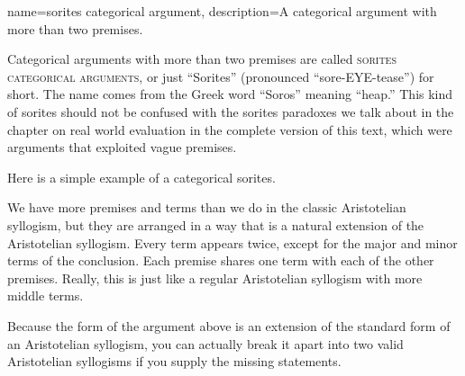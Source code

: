 {
name=sorites categorical argument,
description={A categorical argument with more than two premises.}
}

Categorical arguments with more than two premises are called \textsc{\glspl{sorites categorical argument}}, \label{def:sorites_categorical_arguments} or just ``Sorites'' (pronounced ``sore-EYE-tease'') for short. The name comes from the Greek word ``Soros'' meaning ``heap.'' This kind of sorites should not be confused with the sorites paradoxes we talk about in the chapter on real world evaluation in the complete version of this text, \label{ver_var}  which were arguments that exploited vague premises.

Here is a simple example of a categorical sorites.

\begin{kormanize}
\end{kormanize}

We have more premises and terms than we do in the classic Aristotelian syllogism, but they are arranged in a way that is a natural extension of the Aristotelian syllogism. Every term appears twice, except for the major and minor terms of the conclusion. Each premise shares one term with each of the other premises. Really, this is just like a regular Aristotelian syllogism with more middle terms.

Because the form of the argument above is an extension of the standard form of an Aristotelian syllogism, you can actually break it apart into two valid Aristotelian syllogisms if you supply the missing statements.



